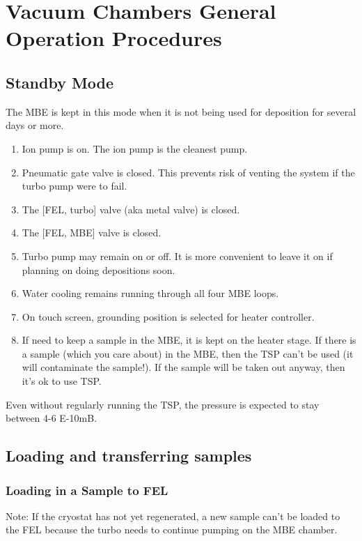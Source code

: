 
\chapter{Vacuum Chambers General Operation Procedures}
\section {Standby Mode}
The MBE is kept in this mode when it is not being used for deposition for several days or more.

\begin{enumerate}
	\item Ion pump is on. The ion pump  is the cleanest pump.
	\item Pneumatic gate valve is closed. This prevents risk of venting the system if the turbo pump were to fail.
	\item The [FEL, turbo] valve (aka metal valve) is closed.
	\item The [FEL, MBE] valve is closed.
	\item Turbo pump may remain on or off. It is more convenient to leave it on if planning on doing depositions soon.
	\item Water cooling remains running through all four MBE loops.
	\item On touch screen, grounding position is selected for heater controller.
	\item If need to keep a sample in the MBE, it is kept on the heater stage. If there is a sample (which you care about) in the MBE, then the TSP can't be used (it will contaminate the sample!). If the sample will be taken out anyway, then it's ok to use TSP.
\end{enumerate}
Even without regularly  running the TSP, the pressure is expected to stay between 4-6 E-10mB.



\section{Loading and transferring samples}
\subsection{Loading in a Sample to FEL}
Note: If the cryostat has not yet regenerated, a new sample can't be loaded to the FEL because the turbo needs to continue pumping on the MBE chamber.

